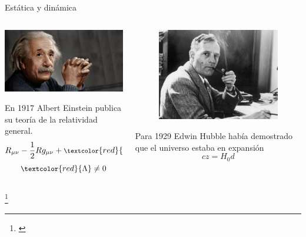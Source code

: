\documentclass[handout]{beamer}
\newcommand\blfootnote[1]
{%
	\begingroup
	\renewcommand\thefootnote{}\footnote{#1}%
	\addtocounter{footnote}{-1}%
	\endgroup
}
\newcommand{\fcite}[1]{\blfootnote{\cite{#1}}}
\begin{document}
\begin{frame}{Estática y dinámica}
	\centering
	\begin{columns}
		\begin{column}{.5\textwidth}
			\includegraphics[width=\linewidth]{sources/images/einstein.jpg}
			
			En 1917 Albert Einstein publica su teoría de la relatividad general.
			\begin{equation}\footnotesize
				R_{\mu\nu} - \dfrac{1}{2}Rg_{\mu\nu} + \textcolor{red}{\Lambda} g_{\mu\nu} = \dfrac{8\pi G}{c^4}T_{\mu\nu}
			\end{equation}
			\begin{equation}\small
				\textcolor{red}{\Lambda} \neq 0
			\end{equation}
		\end{column}
		\begin{column}{.5\textwidth}
			\begin{figure}[h]
				\centering
				\includegraphics[width=0.6\linewidth]{sources/images/hubble.jpg}
			\end{figure}
			Para 1929 Edwin Hubble había demostrado que el universo estaba en expansión
			\begin{equation}
				cz = H_0d
			\end{equation}
		\end{column}
	\end{columns}
	\fcite{shirasaki2015probing}
\end{frame}
\end{document}
